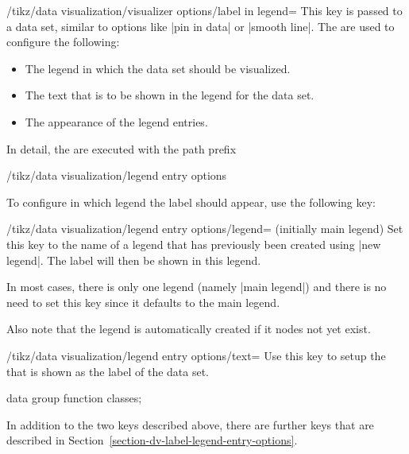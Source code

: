 \begin{key}{/tikz/data visualization/visualizer options/label in legend=}
    This key is passed to a data set, similar to options like |pin in data| or
    |smooth line|. The  are used to configure the following:
    \begin{itemize}
        \item The legend in which the data set should be visualized.
        \item The text that is to be shown in the legend for the data set.
        \item The appearance of the legend entries.
    \end{itemize}
    In detail, the  are executed with the path prefix
\begin{codeexample}
/tikz/data visualization/legend entry options
\end{codeexample}
    To configure in which legend the label should appear, use the
    following key:
    \begin{key}{/tikz/data visualization/legend entry options/legend= (initially main legend)}
        Set this key to the name of a legend that has previously been created
        using |new legend|. The label will then be shown in this legend.

        In most cases, there is only one legend (namely |main legend|) and
        there is no need to set this key since it defaults to the main legend.

        Also note that the legend  is automatically created if it
        nodes not yet exist.
    \end{key}

    \begin{key}{/tikz/data visualization/legend entry options/text=}
        Use this key to setup the  that is shown as the label of the
        data set.
\begin{codeexample}[width=8cm]
\tikz \datavisualization [
  scientific axes, x axis={label=$x$},
  visualize as smooth line/.list=
  {log, lin, squared, exp},
  log=    {label in legend={text=$\log x$}},
  lin=    {label in legend={text=$x/2$}},
  squared={pin in data    ={text=$x^2$, pos=0.1}},
  exp=    {label in data  ={text=$e^x$}},
  style sheet=vary dashing]
data group {function classes};
\end{codeexample}
    \end{key}

    In addition to the two keys described above, there are further keys that
    are described in Section~\ref{section-dv-label-legend-entry-options}.
\end{key}


